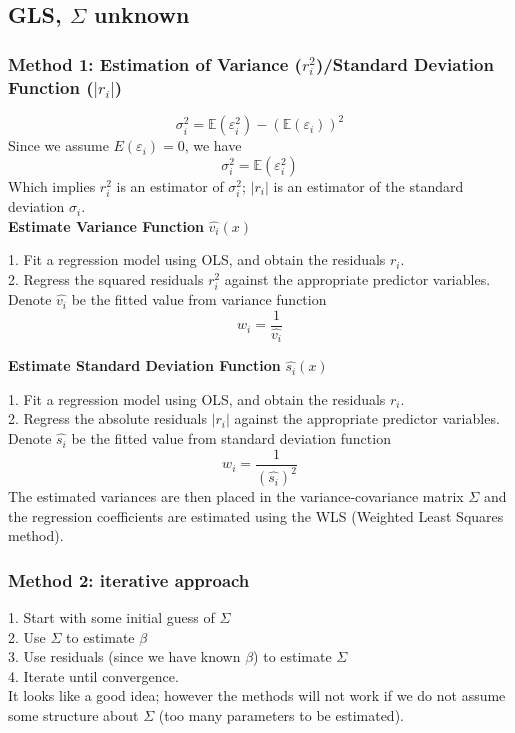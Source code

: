 \documentclass[11pt,a4paper]{article}
\begin{document}
\subsection{GLS, $\Sigma$ unknown}
\subsubsection{Method 1: Estimation of Variance ($r_i^2$)/Standard Deviation Function ($|r_i|$)}
$$\sigma_i^2=\mathbb{E}(\varepsilon_i^2)-(\mathbb{E}(\varepsilon_i))^2$$
Since we assume $E(\varepsilon_i)=0$, we have
$$\sigma_i^2=\mathbb{E}(\varepsilon_i^2)$$
Which implies $r_i^2$ is an estimator of $\sigma_i^2$; $|r_i|$ is an estimator of the standard deviation $\sigma_i$.\\

\textbf{Estimate Variance Function} $\hat{v_i}(x)$

1. Fit a regression model using OLS, and obtain the residuals $r_i$.\\
2. Regress the squared residuals $r_i^2$ against the appropriate predictor variables.\\
Denote $\hat{v_i}$ be the ﬁtted value from variance function
$$w_i=\frac{1}{\hat{v_i}}$$

\textbf{Estimate Standard Deviation Function} $\hat{s_i}(x)$

1. Fit a regression model using OLS, and obtain the residuals $r_i$.\\
2. Regress the absolute residuals $|r_i|$ against the appropriate predictor variables.\\
Denote $\hat{s_i}$ be the ﬁtted value from standard deviation function
$$w_i=\frac{1}{(\hat{s_i})^2}$$
The estimated variances are then placed in the variance-covariance matrix $\Sigma$ and the regression coeﬃcients are estimated using the WLS (Weighted Least Squares method).

\subsubsection{Method 2: iterative approach}
1. Start with some initial guess of $\Sigma$\\
2. Use $\Sigma$ to estimate $\beta$\\
3. Use residuals (since we have known $\beta$) to estimate $\Sigma$\\
4. Iterate until convergence.\\

It looks like a good idea; however the methods will not work if we do not assume some structure about $\Sigma$ (too many parameters to be estimated).
\end{document}
